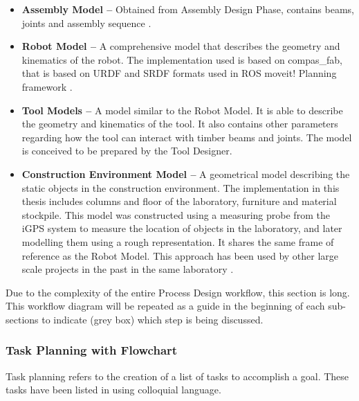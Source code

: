 \begin{itemize}
	\item \textbf{Assembly Model --} Obtained from Assembly Design Phase, contains beams, joints and assembly sequence .

	\item \textbf{Robot Model --} A comprehensive model that describes the geometry and kinematics of the robot. The implementation used is based on compas\_fab, that is based on URDF and SRDF formats used in ROS moveit! Planning framework \parencite{SrdfROSWiki2023, UrdfROSWiki2023}.

	\item \textbf{Tool Models --} A model similar to the Robot Model. It is able to describe the geometry and kinematics of the tool. It also contains other parameters regarding how the tool can interact with timber beams and joints. The model is conceived to be prepared by the Tool Designer.

	\item \textbf{Construction Environment Model --} A geometrical model describing the static objects in the construction environment. The implementation in this thesis includes columns and floor of the laboratory, furniture and material stockpile. This model was constructed using a measuring probe from the iGPS system to measure the location of objects in the laboratory, and later modelling them using a rough representation. It shares the same frame of reference as the Robot Model. This approach has been used by other large scale projects in the past in the same laboratory \parencite{thomaRoboticFabricationBespoke2018}.

\end{itemize}
Due to the complexity of the entire Process Design workflow, this section is long. This workflow diagram will be repeated as a guide in the beginning of each sub-sections to indicate (grey box) which step is being discussed.

\subsubsection{Task Planning with Flowchart}
\label{subsubsection:exploration-3-task-planning-with-flowchart}

Task planning refers to the creation of a list of tasks to accomplish a goal. These tasks have been listed in  using colloquial language.

